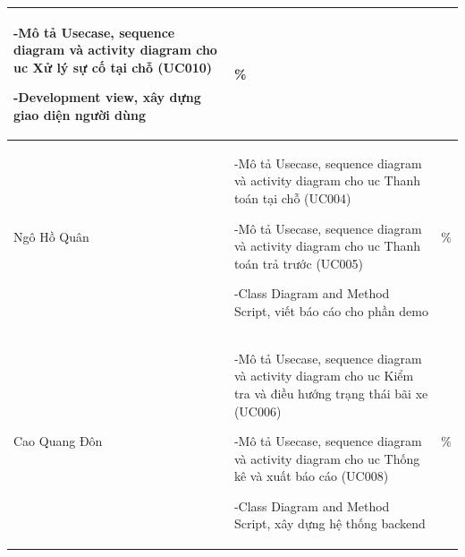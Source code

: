 \begin{center}
\begin{tabular}{|>{\raggedright\arraybackslash}m{4cm}|>{\raggedright\arraybackslash}m{11cm}|>{\centering\arraybackslash}m{2cm}|}
    -Mô tả Usecase, sequence diagram và activity diagram cho uc Xử lý sự cố tại chỗ (UC010)
    
    -Development view, xây dựng giao diện người dùng& 100\% \\ 
\hline
 Ngô Hồ Quân &  
    -Mô tả Usecase, sequence diagram và activity diagram cho uc Thanh toán tại chỗ (UC004) 
    
    -Mô tả Usecase, sequence diagram và activity diagram cho uc Thanh toán trả trước (UC005)
    
    -Class Diagram and Method Script, viết báo cáo cho phần demo & 100\% \\ 
\hline
 Cao Quang Đôn &  
    -Mô tả Usecase, sequence diagram và activity diagram cho uc Kiểm tra và điều hướng trạng thái bãi xe (UC006) 
    
    -Mô tả Usecase, sequence diagram và activity diagram cho uc Thống kê và xuất báo cáo (UC008) 
    
    -Class Diagram and Method Script, xây dựng hệ thống backend & 100\% \\ 
\hline
\end{tabular}
\end{center}




\newpage


